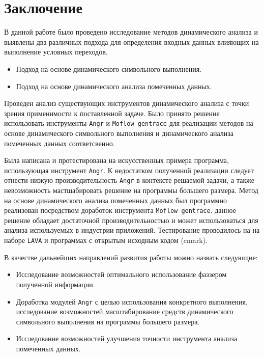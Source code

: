 \chapter*{Заключение}

В данной работе было проведено исследование методов динамического анализа и выявлены два различных подхода для определения входных данных влияющих на выполнение условных переходов.

\begin{itemize}
    \item Подход на основе динамического символьного выполнения.
    \item Подход на основе динамического анализа помеченных данных.
\end{itemize}

Проведен анализ существующих инструментов динамического анализа с точки зрения применимости к поставленной задаче. Было принято решение использовать инструменты \texttt{Angr} и \texttt{Moflow gentrace} для реализации методов на основе динамического символьного выполнения и динамического анализа помеченных данных соответсвенно.

Была написана и протестирована на искусственных примера программа, использующая инструмент \texttt{Angr}. К недостатком полученной реализации следует отнести низкую производительность \texttt{Angr} в контексте решаемой задачи, а также невозможность мастшабировать решение на программы большего размера.
Метод на основе динамического анализа помеченных данных был программно реализован посредством доработок инструмента \texttt{Moflow gentrace}, данное решение обладает достаточной производительностью и может использоваться для анализа используемых в индустрии приложений. Тестирование проводилось на на наборе \texttt{LAVA} и программах с открытым исходным кодом (cmark).


В качестве дальнейших направлений развития работы можно назвать следующие:

\begin{itemize}
    \item Исследование возможностей оптимального использование фаззером полученной информации.
    \item Доработка модулей \texttt{Angr} с целью использования конкретного выполнения, исследование возможностей масштабирование средств динамического символьного выполнения на программы большего размера.
    \item Исследование возможностей улучшения точности инструмента анализа помеченных данных.
\end{itemize}


